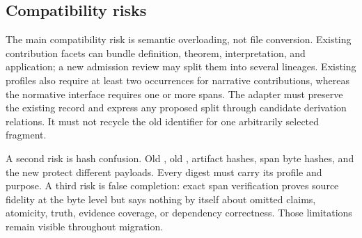 \subsection{Compatibility risks}

The main compatibility risk is semantic overloading, not file conversion. Existing contribution facets can bundle definition, theorem, interpretation, and application; a new admission review may split them into several lineages. Existing profiles also require at least two occurrences for narrative contributions, whereas the normative interface requires one or more spans. The adapter must preserve the existing record and express any proposed split through candidate derivation relations. It must not recycle the old identifier for one arbitrarily selected fragment.

A second risk is hash confusion. Old , old , artifact hashes, span byte hashes, and the new  protect different payloads. Every digest must carry its profile and purpose. A third risk is false completion: exact span verification proves source fidelity at the byte level but says nothing by itself about omitted claims, atomicity, truth, evidence coverage, or dependency correctness. Those limitations remain visible throughout migration.